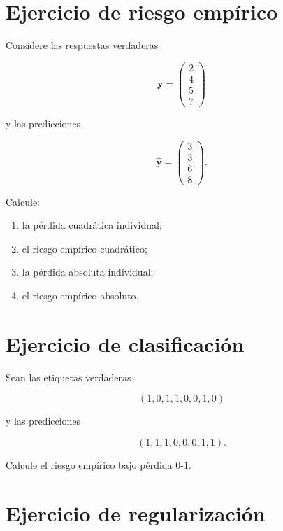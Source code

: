 \documentclass[
  spanish,
  10.5pt,
  letterpaper,
  DIV=11,
  numbers=noendperiod,
  oneside,
  open=any]{scrreprt}
\providecommand{\tightlist}{%
  \setlength{\itemsep}{0pt}\setlength{\parskip}{0pt}}
\theoremstyle{definition}
\theoremstyle{definition}
\theoremstyle{plain}
\theoremstyle{remark}
\begin{document}
\section*{Ejercicio de riesgo
empírico}\label{ejercicio-de-riesgo-empuxedrico}


Considere las respuestas verdaderas

\[
\mathbf{y}
=
\begin{pmatrix}
2\\
4\\
5\\
7
\end{pmatrix}
\]

y las predicciones

\[
\widehat{\mathbf{y}}
=
\begin{pmatrix}
3\\
3\\
6\\
8
\end{pmatrix}.
\]

Calcule:

\begin{enumerate}
\def\labelenumi{\arabic{enumi}.}
\tightlist
\item
  la pérdida cuadrática individual;
\item
  el riesgo empírico cuadrático;
\item
  la pérdida absoluta individual;
\item
  el riesgo empírico absoluto.
\end{enumerate}

\section*{Ejercicio de
clasificación}\label{ejercicio-de-clasificaciuxf3n-1}


Sean las etiquetas verdaderas

\[
(1,0,1,1,0,0,1,0)
\]

y las predicciones

\[
(1,1,1,0,0,0,1,1).
\]

Calcule el riesgo empírico bajo pérdida 0-1.

\section*{Ejercicio de
regularización}\label{ejercicio-de-regularizaciuxf3n}
\end{document}
